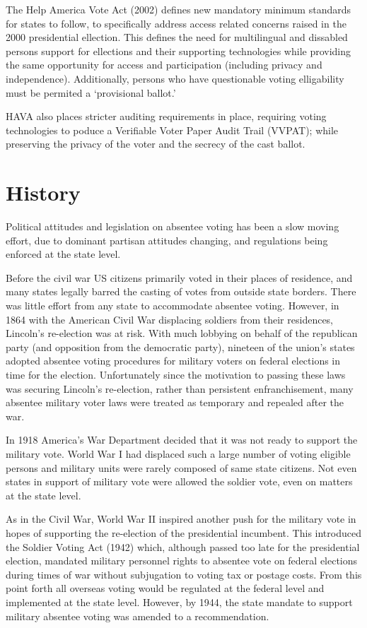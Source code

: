 The Help America Vote Act (2002) defines new mandatory minimum standards for states to follow, to specifically address access related concerns raised in the 2000 presidential ellection. This defines the need for multilingual and dissabled persons support for ellections and their supporting technologies while providing the same opportunity for access and participation (including privacy and independence). Additionally, persons who have questionable voting elligability must be permited a `provisional ballot.' 

HAVA also places stricter auditing requirements in place, requiring voting technologies to poduce a Verifiable Voter Paper Audit Trail (VVPAT); while preserving the privacy of the voter and the secrecy of the cast ballot.



\section{History}
Political attitudes and legislation on absentee voting has been a slow moving effort, due to dominant partisan attitudes changing, and regulations being enforced at the state level.

Before the civil war US citizens primarily voted in their places of residence, and many states legally barred the casting of votes from outside state borders. There was little effort from any state to accommodate absentee voting. However, in 1864 with the American Civil War displacing soldiers from their residences, Lincoln's re-election was at risk. With much lobbying on behalf of the republican party (and opposition from the democratic party), nineteen of the union's states adopted absentee voting procedures for military voters on federal elections in time for the election. Unfortunately since the motivation to passing these laws was securing Lincoln's re-election, rather than persistent enfranchisement, many absentee military voter laws were treated as temporary and repealed after the war.

In 1918 America's War Department decided that it was not ready to support the military vote. World War I had displaced such a large number of voting eligible persons and military units were rarely composed of same state citizens. Not even states in support of military vote were allowed the soldier vote, even on matters at the state level.

As in the Civil War, World War II inspired another push for the military vote in hopes of supporting the re-election of the presidential incumbent. This introduced the Soldier Voting Act (1942) which, although passed too late for the presidential election, mandated military personnel rights to absentee vote on federal elections during times of war without subjugation to voting tax or postage costs. From this point forth all overseas voting would be regulated at the federal level and implemented at the state level. However, by 1944, the state mandate to support military absentee voting was amended to a recommendation.

